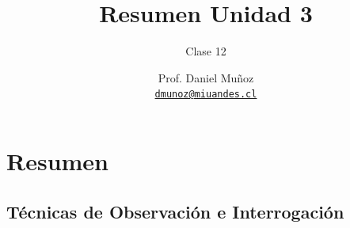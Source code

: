 \documentclass[11pt, aspectratio=169, xcolor=table,hyphens]{beamer}
\begin{document}
\author{Prof. Daniel Muñoz \\
	\href{mailto:dmunoz@miuandes.cl}{\texttt{dmunoz@miuandes.cl}}}
\title{Resumen Unidad 3}
\subtitle{Clase 12}
\date{}
\maketitle

\section{Resumen}

\subsection{Técnicas de Observación e Interrogación}
\end{document}
